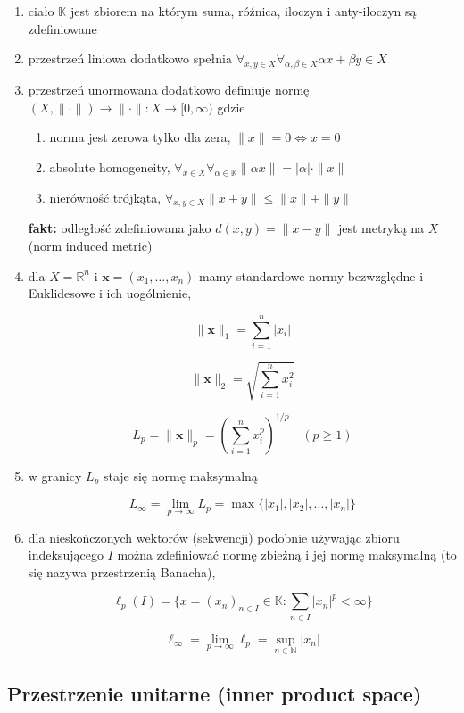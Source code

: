 \documentclass{article}
\begin{document}
\begin{enumerate}
\item ciało $\mathbb{K}$ jest zbiorem na którym suma, róźnica, iloczyn i anty-iloczyn są zdefiniowane
\item przestrzeń liniowa dodatkowo spełnia $\forall_{x,y \in X} \forall_{\alpha,\beta \in X} \alpha x + \beta y \in X$
\item przestrzeń unormowana dodatkowo definiuje normę $(X, \|\cdot\|) \rightarrow \|\cdot\|: X \to [0,\infty)$ gdzie
\begin{enumerate}
\item norma jest zerowa tylko dla zera, $\|x\| = 0 \Leftrightarrow x = 0$
\item absolute homogeneity, $\forall_{x \in X} \forall_{\alpha \in \mathbb{K}} \|\alpha x\| = |\alpha| \cdot \|x\|$
\item nierówność trójkąta, $\forall_{x,y \in X} \|x+y\| \leq \|x\| + \|y\|$
\end{enumerate}

\textbf{fakt:} odległość zdefiniowana jako $d(x,y) = \|x-y\|$ jest metryką na $X$ (norm induced metric)

\item dla $X = \mathbb{R}^n$ i $\mathbf{x} = (x_1, \ldots, x_n)$ mamy standardowe normy bezwzględne i Euklidesowe i ich uogólnienie,

$$\|\mathbf{x}\|_1 = \sum_{i=1}^{n} |x_i|$$

$$\|\mathbf{x}\|_2 = \sqrt{\sum_{i=1}^{n} x_i^2}$$

$$L_p = \|\mathbf{x}\|_p = \left(\sum_{i=1}^{n} x_i^p\right)^{1/p} \quad (p \geq 1)$$
\item w granicy $L_p$ staje się normę maksymalną

$$L_\infty = \lim_{p \rightarrow \infty} L_p = \max\lbrace |x_1|, |x_2|, ..., |x_n| \rbrace$$

\item dla nieskończonych wektorów (sekwencji) podobnie używając zbioru indeksującego $I$ można zdefiniować normę zbieżną i jej normę maksymalną (to się nazywa przestrzenią Banacha),

$$\ell_p(I) = \{ x = (x_n)_{n \in I}  \in \mathbb{K}: \sum_{n \in I} |x_n|^p < \infty \}$$

$$\ell_\infty = \lim_{p \rightarrow \infty} \ell_p = \sup_{n \in \mathbb{N}} |x_n|$$
\end{enumerate}

\subsection{Przestrzenie unitarne (inner product space)}
\end{document}
